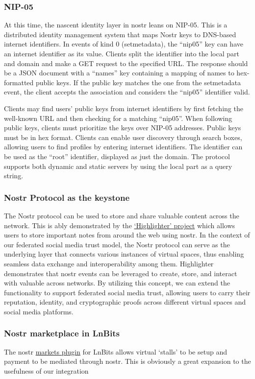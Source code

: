 \subsubsection{NIP-05}
At this time, the nascent identity layer in nostr leans on NIP-05. This is a distributed identity management system that maps Nostr keys to DNS-based internet identifiers. In events of kind 0 (setmetadata), the ``nip05'' key can have an internet identifier as its value. Clients split the identifier into the local part and domain and make a GET request to the specified URL. The response should be a JSON document with a ``names'' key containing a mapping of names to hex-formatted public keys. If the public key matches the one from the setmetadata event, the client accepts the association and considers the ``nip05'' identifier valid.\par
Clients may find users' public keys from internet identifiers by first fetching the well-known URL and then checking for a matching ``nip05''. When following public keys, clients must prioritize the keys over NIP-05 addresses. Public keys must be in hex format. Clients can enable user discovery through search boxes, allowing users to find profiles by entering internet identifiers. The identifier can be used as the ``root'' identifier, displayed as just the domain. The protocol supports both dynamic and static servers by using the local part as a query string.
\subsubsection{Nostr Protocol as the keystone}
The Nostr protocol can be used to store and share valuable content across the network. This is ably demonstrated by the \href{https://highlighter.com/}{`Highlighter' project} which allows users to store important notes from around the web using nostr. In the context of our federated social media trust model, the Nostr protocol can serve as the underlying layer that connects various instances of virtual spaces, thus enabling seamless data exchange and interoperability among them. Highlighter demonstrates that nostr events can be leveraged to create, store, and interact with valuable across networks. By utilizing this concept, we can extend the functionality to support federated social media trust, allowing users to carry their reputation, identity, and cryptographic proofs across different virtual spaces and social media platforms.
\subsubsection{Nostr marketplace in LnBits}
The nostr \href{https://github.com/lnbits/nostrmarket}{markets plugin} for LnBits allows virtual `stalls' to be setup and payment to be mediated through nostr. This is obviously a great expansion to the usefulness of our integration
